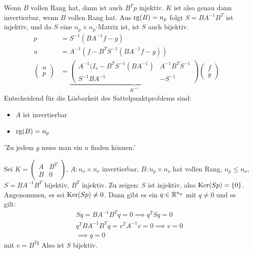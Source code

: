 Wenn $B$ vollen Rang hat, dann ist auch $B^{T}p$ injektiv. $K$ ist also genau dann invertierbar, wenn $B$ vollen Rang hat. Aus $\operatorname{rg} (B) = n_{p}$ folgt $S = BA^{-1}B^{T}$ ist injektiv, und da $S$ eine $n_{p} \times n_{p}$-Matrix ist, ist $S$ auch bijektiv.
\begin{align*}
  p &= S^{-1}(BA^{-1}f-g)\\
  u &= A^{-1}(f - B^{T}S^{-1}(BA^{-1}f-g))\\
  \begin{pmatrix}
    u\\p
  \end{pmatrix}
&=\underbrace{
\begin{pmatrix}
   A^{-1}(I_{v} - B^{T}S^{-1}(BA^{-1}) & A^{-1}B^{T}S^{-1}\\
S^{-1}BA^{-1}& -S^{-1}
\end{pmatrix}}_{K^{-1}}
\begin{pmatrix}
  f\\g
\end{pmatrix}
\end{align*}
Entscheidend für die Lösbarkeit des Sattelpunktproblems sind:
\begin{itemize}
\item $A$ ist invertierbar
\item $\operatorname{rg} (B) = n_{p}$
\end{itemize}
'Zu jedem $g$ muss man ein $u$ finden können.'


Sei $K =
\begin{pmatrix}
  A & B^{T}\\ B & 0
\end{pmatrix}
$, $A: n_{\nu} \times n_{\nu}$ invertierbar, $B: n_{p} \times n_{\nu}$ hat vollen Rang, $n_{p}\leq n_{\nu}$, $S = BA^{-1}B^{T}$ bijektiv, $B^{T}$ injektiv. Zu zeigen: $S$ ist injektiv, also $\operatorname{Ker}(Sp) = \left\{ 0 \right\}$. Angenommen, es sei $\operatorname{Ker}(Sp) \neq 0$. Dann gibt es ein $q \in \mathbb{R}^{n_{p}}$ mit $q \neq 0$ und es gilt:
\begin{align*}
&  Sq = BA^{-1}B^{T}q = 0 \implies q^{T}Sq = 0\\
&q^{T}BA^{-1}B^{T}q = v^{T}A^{-1}v = 0 \implies v = 0\\
&\implies q = 0
\end{align*}
mit $v = B^{Tq}$
Also ist $S$ bijektiv. 

